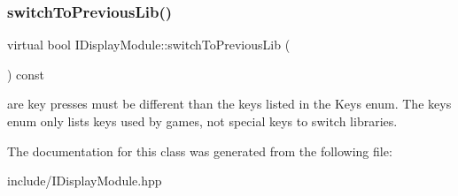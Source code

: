 \subsubsection{\texorpdfstring{switch\+To\+Previous\+Lib()}{switchToPreviousLib()}}
{\footnotesize\ttfamily virtual bool I\+Display\+Module\+::switch\+To\+Previous\+Lib (\begin{DoxyParamCaption}{ }\end{DoxyParamCaption}) const\hspace{0.3cm}{\ttfamily [pure virtual]}}

are key presses must be different than the keys listed in the Keys enum. The keys enum only lists keys used by games, not special keys to switch libraries. 

The documentation for this class was generated from the following file\+:\begin{DoxyCompactItemize}
\item 
include/I\+Display\+Module.\+hpp\end{DoxyCompactItemize}

